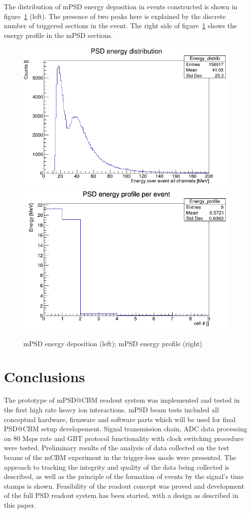 \documentclass[a4paper,11pt]{article}
\begin{document}
The distribution of mPSD energy deposition in events constructed is shown in figure~\ref{fig:7} (left). The presence of two peaks here is explained by the discrete number of triggered sections in the event. The right side of figure~\ref{fig:7} shows the energy profile in the mPSD sections.

\begin{figure}[htbp]
\centering %
\includegraphics[width=.45\textwidth]{PsdEdepInEvent_calibrd.png}
\qquad
\includegraphics[width=.45\textwidth]{PsdEprofileInEvent_calibrd.png}
\caption{\label{fig:7} mPSD energy deposition (left); mPSD energy profile (right)}
\end{figure}

\section{Conclusions}
The prototype of mPSD@CBM readout system was implemented and tested in the first high rate heavy ion interactions. mPSD beam tests included all conceptual hardware, firmware and software parts which will be used for final PSD@CBM setup developement. Signal transmission chain, ADC data processing on 80 Msps rate and GBT protocol functionality with clock switching procedure were tested. Preliminary results of the analysis of data collected on the test beams of the mCBM experiment in the trigger-less mode were presented. The approach to tracking the integrity and quality of the data being collected is described, as well as the principle of the formation of events by the signal's time stamps is shown.
Feasibility of the readout concept was proved and development of the full PSD readout system has been started, with a design as described in this paper.
\end{document}
